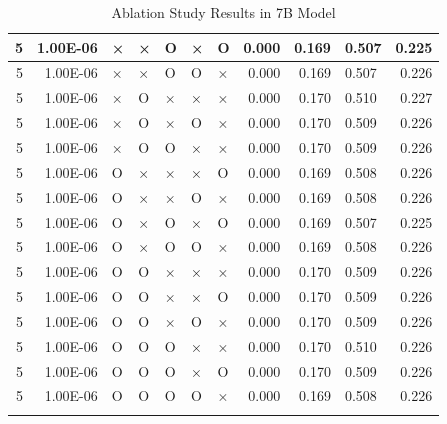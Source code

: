 \documentclass[11pt]{article}
\begin{document}
\begin{longtable}[h]{|r|r|l|l|l|l|l|r|r|l|r|}
5 & 1.00E-06 & × & × & O & × & O & 0.000 & 0.169 & 0.507 & 0.225 \\ \hline
5 & 1.00E-06 & × & × & O & O & × & 0.000 & 0.169 & 0.507 & 0.226 \\ \hline
5 & 1.00E-06 & × & O & × & × & × & 0.000 & 0.170 & 0.510 & 0.227 \\ \hline
5 & 1.00E-06 & × & O & × & O & × & 0.000 & 0.170 & 0.509 & 0.226 \\ \hline
5 & 1.00E-06 & × & O & O & × & × & 0.000 & 0.170 & 0.509 & 0.226 \\ \hline
5 & 1.00E-06 & O & × & × & × & O & 0.000 & 0.169 & 0.508 & 0.226 \\ \hline
5 & 1.00E-06 & O & × & × & O & × & 0.000 & 0.169 & 0.508 & 0.226 \\ \hline
5 & 1.00E-06 & O & × & O & × & O & 0.000 & 0.169 & 0.507 & 0.225 \\ \hline
5 & 1.00E-06 & O & × & O & O & × & 0.000 & 0.169 & 0.508 & 0.226 \\ \hline
5 & 1.00E-06 & O & O & × & × & × & 0.000 & 0.170 & 0.509 & 0.226 \\ \hline
5 & 1.00E-06 & O & O & × & × & O & 0.000 & 0.170 & 0.509 & 0.226 \\ \hline
5 & 1.00E-06 & O & O & × & O & × & 0.000 & 0.170 & 0.509 & 0.226 \\ \hline
5 & 1.00E-06 & O & O & O & × & × & 0.000 & 0.170 & 0.510 & 0.226 \\ \hline
5 & 1.00E-06 & O & O & O & × & O & 0.000 & 0.170 & 0.509 & 0.226 \\ \hline
5 & 1.00E-06 & O & O & O & O & × & 0.000 & 0.169 & 0.508 & 0.226 \\ \hline


\caption{Ablation Study Results in 7B Model}
\label{sec:tab_app_ablation}
\end{longtable}

\end{document}

